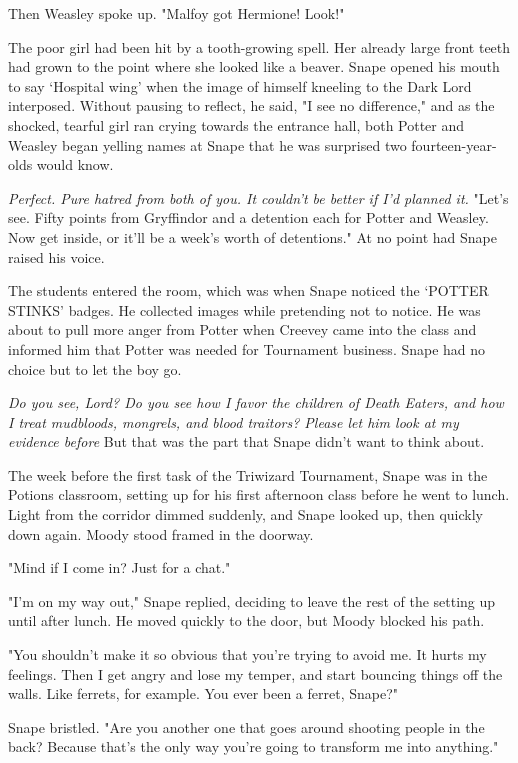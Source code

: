 Then Weasley spoke up. "Malfoy got Hermione! Look!"

The poor girl had been hit by a tooth-growing spell. Her already large front teeth had grown to the point where she looked like a beaver. Snape opened his mouth to say `Hospital wing' when the image of himself kneeling to the Dark Lord interposed. Without pausing to reflect, he said, "I see no difference," and as the shocked, tearful girl ran crying towards the entrance hall, both Potter and Weasley began yelling names at Snape that he was surprised two fourteen-year-olds would know.

\emph{Perfect. Pure hatred from both of you. It couldn't be better if I'd planned it.} "Let's see. Fifty points from Gryffindor and a detention each for Potter and Weasley. Now get inside, or it'll be a week's worth of detentions." At no point had Snape raised his voice.

The students entered the room, which was when Snape noticed the `POTTER STINKS' badges. He collected images while pretending not to notice. He was about to pull more anger from Potter when Creevey came into the class and informed him that Potter was needed for Tournament business. Snape had no choice but to let the boy go.

\emph{Do you see, Lord? Do you see how I favor the children of Death Eaters, and how I treat mudbloods, mongrels, and blood traitors? Please let him look at my evidence before{\el}} But that was the part that Snape didn't want to think about.

The week before the first task of the Triwizard Tournament, Snape was in the Potions classroom, setting up for his first afternoon class before he went to lunch. Light from the corridor dimmed suddenly, and Snape looked up, then quickly down again. Moody stood framed in the doorway.

"Mind if I come in? Just for a chat."

"I'm on my way out," Snape replied, deciding to leave the rest of the setting up until after lunch. He moved quickly to the door, but Moody blocked his path.

"You shouldn't make it so obvious that you're trying to avoid me. It hurts my feelings. Then I get angry and lose my temper, and start bouncing things off the walls. Like ferrets, for example. You ever been a ferret, Snape?"

Snape bristled. "Are you another one that goes around shooting people in the back? Because that's the only way you're going to transform me into anything."


